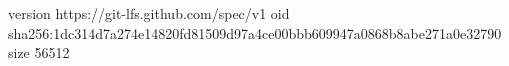 version https://git-lfs.github.com/spec/v1
oid sha256:1dc314d7a274e14820fd81509d97a4ce00bbb609947a0868b8abe271a0e32790
size 56512

